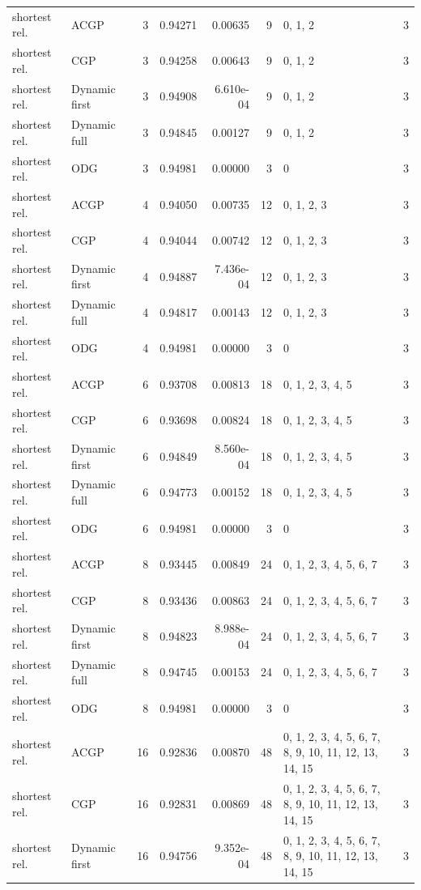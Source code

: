 \documentclass[10pt,a4paper]{article}
\begin{document}
\begin{longtable}{@{}p{23mm}p{29mm}rrrrp{36mm}r@{}}
shortest rel. & ACGP & 3 & 0.94271 & 0.00635 & 9 & 0, 1, 2 & 3 \\
shortest rel. & CGP & 3 & 0.94258 & 0.00643 & 9 & 0, 1, 2 & 3 \\
shortest rel. & Dynamic first & 3 & 0.94908 & 6.610e-04 & 9 & 0, 1, 2 & 3 \\
shortest rel. & Dynamic full & 3 & 0.94845 & 0.00127 & 9 & 0, 1, 2 & 3 \\
shortest rel. & ODG & 3 & 0.94981 & 0.00000 & 3 & 0 & 3 \\
shortest rel. & ACGP & 4 & 0.94050 & 0.00735 & 12 & 0, 1, 2, 3 & 3 \\
shortest rel. & CGP & 4 & 0.94044 & 0.00742 & 12 & 0, 1, 2, 3 & 3 \\
shortest rel. & Dynamic first & 4 & 0.94887 & 7.436e-04 & 12 & 0, 1, 2, 3 & 3 \\
shortest rel. & Dynamic full & 4 & 0.94817 & 0.00143 & 12 & 0, 1, 2, 3 & 3 \\
shortest rel. & ODG & 4 & 0.94981 & 0.00000 & 3 & 0 & 3 \\
shortest rel. & ACGP & 6 & 0.93708 & 0.00813 & 18 & 0, 1, 2, 3, 4, 5 & 3 \\
shortest rel. & CGP & 6 & 0.93698 & 0.00824 & 18 & 0, 1, 2, 3, 4, 5 & 3 \\
shortest rel. & Dynamic first & 6 & 0.94849 & 8.560e-04 & 18 & 0, 1, 2, 3, 4, 5 & 3 \\
shortest rel. & Dynamic full & 6 & 0.94773 & 0.00152 & 18 & 0, 1, 2, 3, 4, 5 & 3 \\
shortest rel. & ODG & 6 & 0.94981 & 0.00000 & 3 & 0 & 3 \\
shortest rel. & ACGP & 8 & 0.93445 & 0.00849 & 24 & 0, 1, 2, 3, 4, 5, 6, 7 & 3 \\
shortest rel. & CGP & 8 & 0.93436 & 0.00863 & 24 & 0, 1, 2, 3, 4, 5, 6, 7 & 3 \\
shortest rel. & Dynamic first & 8 & 0.94823 & 8.988e-04 & 24 & 0, 1, 2, 3, 4, 5, 6, 7 & 3 \\
shortest rel. & Dynamic full & 8 & 0.94745 & 0.00153 & 24 & 0, 1, 2, 3, 4, 5, 6, 7 & 3 \\
shortest rel. & ODG & 8 & 0.94981 & 0.00000 & 3 & 0 & 3 \\
shortest rel. & ACGP & 16 & 0.92836 & 0.00870 & 48 & 0, 1, 2, 3, 4, 5, 6, 7, 8, 9, 10, 11, 12, 13, 14, 15 & 3 \\
shortest rel. & CGP & 16 & 0.92831 & 0.00869 & 48 & 0, 1, 2, 3, 4, 5, 6, 7, 8, 9, 10, 11, 12, 13, 14, 15 & 3 \\
shortest rel. & Dynamic first & 16 & 0.94756 & 9.352e-04 & 48 & 0, 1, 2, 3, 4, 5, 6, 7, 8, 9, 10, 11, 12, 13, 14, 15 & 3 \\

\end{longtable}
\end{document}
